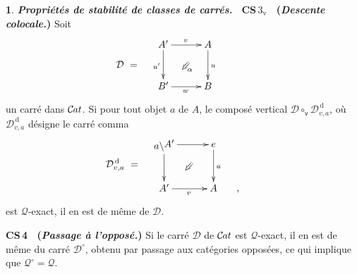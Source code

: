 \documentclass[francais]{smfart}
\theoremstyle{plain}
\theoremstyle{remark}
\theoremstyle{definition}
\newtheorem{paragr}[thm]{}
\numberwithin{equation}{thm}
\begin{document}
\begin{paragr} {\emph{\textbf{{Propriétés de stabilité de classes de carrés}.\ }}}
\noindent
\textbf{\boldmath CS\,$3_{\mathrm v}$ \ (\emph{Descente colocale.})} Soit 
\[
\mathcal{D}\ =\quad
\raise 23pt
\vbox{
\UseTwocells
\xymatrixcolsep{2.5pc}
\xymatrixrowsep{2.4pc}
\xymatrix{
A'\ar[d]_{u'}\ar[r]^{v}
\drtwocell<\omit>{\alpha}
&A\ar[d]^{u}
\\
B'\ar[r]_{w}
&B
&\hskip -30pt
}
}
\] 
un carré dans ${{\mathcal{C} \mspace{-2.mu} \it{at}}}$. Si pour tout objet $a$ de $A$, le composé vertical $\mathcal D{\circ^{}_{\mathsf v}} \mathcal{D}^{\mathrm{\,d}}_{v,a}$, où $\mathcal{D}^{\mathrm{\,d}}_{v,a}$ désigne le carré comma
\[
\hskip 15pt
\mathcal{D}_{v,a}^{\mathrm{\,d}}\ =\quad
\raise 23pt
\vbox{
\UseTwocells
\xymatrixcolsep{2.5pc}
\xymatrixrowsep{2.4pc}
\xymatrix{
{\mathchoice {\raise -1.8pt\vbox{\hbox{${a}\backslash$}}{A'}} {\raise -1.8pt\vbox{\hbox{${a}\backslash$}}{A'}} {\raise -1.8pt\vbox{\hbox{$\scriptstyle{a}\backslash$}}{A'}} {\raise -1.8pt\vbox{\hbox{$\scriptscriptstyle{a}\backslash$}}{A'}} }\ar[d]_{}\ar[r]^{}
\drtwocell<\omit>{}
&e\ar[d]^{a}
\\
A'\ar[r]_{v}
&A
&\hskip -30pt,
}
}\qquad
\]
est ${\mathcal{Q}}$-exact, il en est de même de $\mathcal D$.
\smallbreak

\noindent
\textbf{CS\,4 \ (\emph{Passage à l'opposé.})} Si le carré $\mathcal D$ de ${{\mathcal{C} \mspace{-2.mu} \it{at}}}$ est ${\mathcal{Q}}${\nobreakdash}-exact, il en est de même du carré ${{{\mathcal D}}^{\circ}}$, obtenu par passage aux catégories opposées, ce qui implique que ${{{\mathcal{Q}}}^{\circ}}={\mathcal{Q}}$.
\end{paragr}
\end{document}
